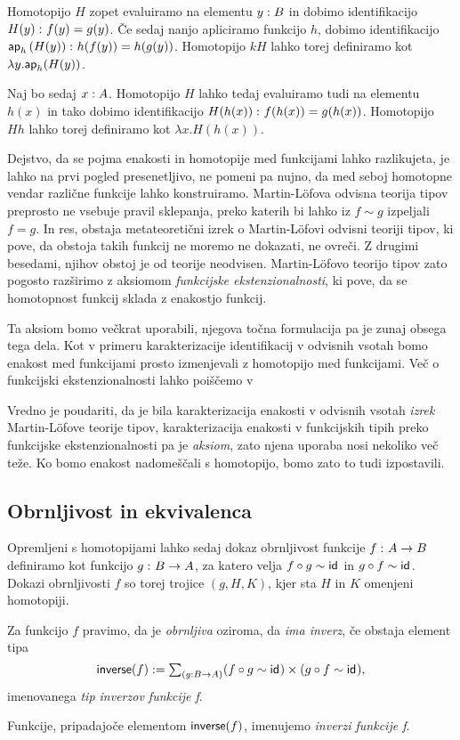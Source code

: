 \begin{dokaz}
  Homotopijo \(H\) zopet evaluiramo na elementu \(y : B\) in dobimo
  identifikacijo \(H(y) \,\colon f(y) = g(y)\). Če sedaj nanjo apliciramo funkcijo \(h\),
  dobimo identifikacijo \(\textnormal{\textsf{ap}}_{h}\,(H(y)) \,\colon h(f(y)) = h(g(y))\). Homotopijo \(kH\) lahko
  torej definiramo kot
  \(\lambda y. \textnormal{\textsf{ap}}_{h}(H(y))\).

  Naj bo sedaj \(x : A\). Homotopijo \(H\) lahko tedaj evaluiramo tudi
  na elementu \(h(x)\) in tako dobimo identifikacijo
  \(H(h(x)) \,\colon f(h(x)) = g(h(x))\). Homotopijo \(Hh\) lahko torej definiramo kot
  \(\lambda x.H(h(x))\).
\end{dokaz}

Dejstvo, da se pojma enakosti in homotopije med funkcijami lahko razlikujeta, je lahko na prvi pogled presenetljivo, ne pomeni pa nujno, da med seboj homotopne vendar različne funkcije lahko konstruiramo. Martin-Löfova odvisna teorija tipov preprosto ne vsebuje pravil sklepanja, preko katerih bi lahko iz \(f \sim g\) izpeljali \(f = g\). In res, obstaja metateoretični izrek o Martin-Löfovi odvisni teoriji tipov, ki pove, da obstoja takih funkcij ne moremo ne dokazati, ne ovreči. Z drugimi besedami, njihov obstoj je od teorije neodvisen. Martin-Löfovo teorijo tipov zato pogosto razširimo z aksiomom \emph{funkcijske ekstenzionalnosti}, ki pove, da se homotopnost funkcij sklada z enakostjo funkcij.

Ta aksiom bomo večkrat uporabili, njegova točna formulacija pa je zunaj obsega tega dela. Kot v primeru karakterizacije identifikacij v odvisnih vsotah bomo enakost med funkcijami prosto izmenjevali z homotopijo med funkcijami. Več o funkcijski ekstenzionalnosti lahko poiščemo v \cite[Poglavje II.13]{rijke2022introduction}

Vredno je poudariti, da je bila karakterizacija enakosti v odvisnih vsotah \emph{izrek} Martin-Löfove teorije tipov, karakterizacija enakosti v funkcijskih tipih preko funkcijske ekstenzionalnosti pa je \emph{aksiom}, zato njena uporaba nosi nekoliko več teže. Ko bomo enakost nadomeščali s homotopijo, bomo zato to tudi izpostavili.

\subsection{Obrnljivost in ekvivalenca}
Opremljeni s homotopijami lahko sedaj dokaz obrnljivost funkcije \(f \,\colon A \to B\) definiramo kot funkcijo \(g \,\colon B \to A\), za katero velja \(f \circ g \sim \textnormal{\textsf{id}}_{}\) in
\(g \circ f \sim \textnormal{\textsf{id}}_{}\). Dokazi obrnljivosti \(f\) so torej trojice \((g, H, K)\), kjer sta \(H\) in \(K\) omenjeni homotopiji.
\begin{definicija}
  Za funkcijo \(f\) pravimo, da je \emph{obrnljiva} oziroma, da \emph{ima inverz},
  če obstaja element tipa
  \[\textnormal{\textsf{inverse}}(f) := \textstyle \sum_{\left( g : B \to A \right)} (f \circ g \sim \textnormal{\textsf{id}}_{}) \times (g \circ f \sim \textnormal{\textsf{id}}_{}),\]
  imenovanega \emph{tip inverzov funkcije f}.

  Funkcije, pripadajoče elementom \(\textnormal{\textsf{inverse}}(f)\), imenujemo \emph{inverzi funkcije f}.
\end{definicija}

